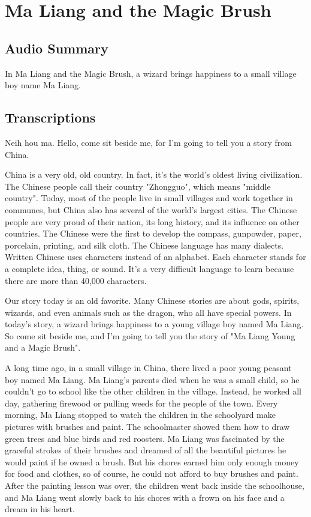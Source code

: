 \section{Ma Liang and the Magic Brush}

\subsection{Audio Summary}

In Ma Liang and the Magic Brush, a wizard brings happiness to a small village boy name Ma Liang.

\subsection{Transcriptions}

Neih hou ma. Hello, come sit beside me, for I'm going to tell you a story from China.

China is a very old, old country. In fact, it's the world's oldest living civilization. The Chinese people call their country "Zhongguo", which means "middle country". Today, most of the people live in small villages and work together in communes, but China also has several of the world's largest cities. The Chinese people are very proud of their nation, its long history, and its influence on other countries. The Chinese were the first to develop the compass, gunpowder, paper, porcelain, printing, and silk cloth. The Chinese language has many dialects. Written Chinese uses characters instead of an alphabet. Each character stands for a complete idea, thing, or sound. It's a very difficult language to learn because there are more than 40,000 characters.

Our story today is an old favorite. Many Chinese stories are about gods, spirits, wizards, and even animals such as the dragon, who all have special powers. In today's story, a wizard brings happiness to a young village boy named Ma Liang. So come sit beside me, and I'm going to tell you the story of "Ma Liang Young and a Magic Brush".

A long time ago, in a small village in China, there lived a poor young peasant boy named Ma Liang. Ma Liang's parents died when he was a small child, so he couldn't go to school like the other children in the village. Instead, he worked all day, gathering firewood or pulling weeds for the people of the town. Every morning, Ma Liang stopped to watch the children in the schoolyard make pictures with brushes and paint. The schoolmaster showed them how to draw green trees and blue birds and red roosters. Ma Liang was fascinated by the graceful strokes of their brushes and dreamed of all the beautiful pictures he would paint if he owned a brush. But his chores earned him only enough money for food and clothes, so of course, he could not afford to buy brushes and paint. After the painting lesson was over, the children went back inside the schoolhouse, and Ma Liang went slowly back to his chores with a frown on his face and a dream in his heart.

